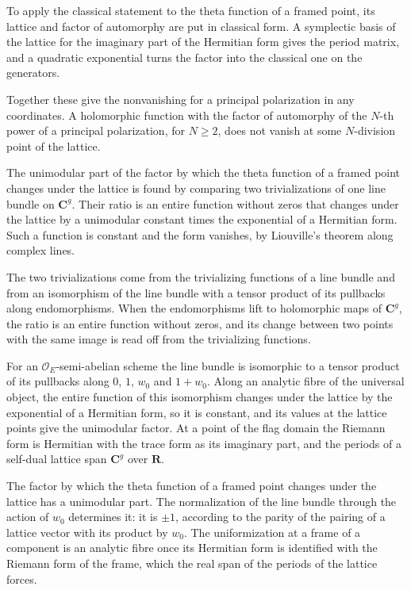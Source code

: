 To apply the classical statement to the theta function of a framed point, its lattice and factor of automorphy are
put in classical form. A symplectic basis of the lattice for the imaginary part of the Hermitian form gives the
period matrix, and a quadratic exponential turns the factor into the classical one on the generators.

Together these give the nonvanishing for a principal polarization in any coordinates. A holomorphic function with
the factor of automorphy of the $N$-th power of a principal polarization, for $N\ge2$, does not vanish at some
$N$-division point of the lattice.

The unimodular part of the factor by which the theta function of a framed point changes under the lattice is found
by comparing two trivializations of one line bundle on $\mathbf C^g$. Their ratio is an entire function without
zeros that changes under the lattice by a unimodular constant times the exponential of a Hermitian form. Such a
function is constant and the form vanishes, by Liouville's theorem along complex lines.

The two trivializations come from the trivializing functions of a line bundle and from an isomorphism of the line
bundle with a tensor product of its pullbacks along endomorphisms. When the endomorphisms lift to holomorphic maps
of $\mathbf C^g$, the ratio is an entire function without zeros, and its change between two points with the same
image is read off from the trivializing functions.

For an $\mathcal O_E$-semi-abelian scheme the line bundle is isomorphic to a tensor product of its pullbacks along
$0$, $1$, $w_0$ and $1+w_0$. Along an analytic fibre of the universal object, the entire function of this
isomorphism changes under the lattice by the exponential of a Hermitian form, so it is constant, and its values at
the lattice points give the unimodular factor. At a point of the flag domain the Riemann form is Hermitian with the
trace form as its imaginary part, and the periods of a self-dual lattice span $\mathbf C^g$ over $\mathbf R$.

The factor by which the theta function of a framed point changes under the lattice has a unimodular part. The
normalization of the line bundle through the action of $w_0$ determines it: it is $\pm1$, according to the parity of
the pairing of a lattice vector with its product by $w_0$. The uniformization at a frame of a component is an
analytic fibre once its Hermitian form is identified with the Riemann form of the frame, which the real span of the
periods of the lattice forces.

